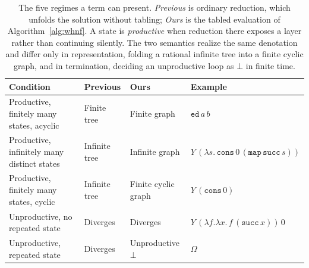 \begin{table}
  \caption{The five regimes a term can present. \emph{Previous} is ordinary reduction, which unfolds the
    solution without tabling; \emph{Ours} is the tabled evaluation of Algorithm~\ref{alg:whnf}. A state is
    \emph{productive} when reduction there exposes a layer rather than continuing silently. The two
    semantics realize the same denotation and differ only in representation, folding a rational infinite
    tree into a finite cyclic graph, and in termination, deciding an unproductive loop as $\bot$ in finite
  time.}
  \label{tab:cases}
  \centering\footnotesize
  \setlength{\tabcolsep}{5pt}
  \begin{tabular}{@{}p{}p{}p{}p{}@{}}
    \hline
    Condition & Previous & Ours & Example \\
    \hline
    Productive, finitely many states, acyclic & Finite tree & Finite graph & $\mathtt{ed}\,a\,b$ \\
    Productive, infinitely many distinct states & Infinite tree & Infinite graph & $Y\,(\lambda s.\,\mathtt{cons}\,0\,(\mathtt{map}\,\mathtt{succ}\,s))$ \\
    Productive, finitely many states, cyclic & Infinite tree & Finite cyclic graph & $Y\,(\mathtt{cons}\,0)$ \\
    Unproductive, no repeated state & Diverges & Diverges & $Y\,(\lambda f.\lambda x.\,f\,(\mathtt{succ}\,x))\,0$ \\
    Unproductive, repeated state & Diverges & Unproductive $\bot$ & $\Omega$ \\
    \hline
  \end{tabular}
\end{table}

